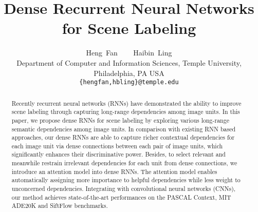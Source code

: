 \documentclass[10pt,twocolumn,letterpaper]{article}
\begin{document}
\title{Dense Recurrent Neural Networks for Scene Labeling}

\author{Heng~Fan ~~~ Haibin~Ling\\
Department of Computer and Information Sciences, Temple University, Philadelphia, PA USA\\
{\tt\small \{hengfan,hbling\}@temple.edu}
}

\maketitle
\thispagestyle{empty}

\begin{abstract}
  Recently recurrent neural networks (RNNs) have demonstrated the ability to improve scene labeling through capturing long-range dependencies among image units. In this paper, we propose dense RNNs for scene labeling by exploring various long-range semantic dependencies among image units. In comparison with existing RNN based approaches, our dense RNNs are able to capture richer contextual dependencies for each image unit via dense connections between each pair of image units, which significantly enhances their discriminative power. Besides, to select relevant and meanwhile restrain irrelevant dependencies for each unit from dense connections, we introduce an attention model into dense RNNs. The attention model enables automatically assigning more importance to helpful dependencies while less weight to unconcerned dependencies. Integrating with convolutional neural networks (CNNs), our method achieves state-of-the-art performances on the PASCAL Context, MIT ADE20K and SiftFlow benchmarks.
  \end{abstract}

\end{document}

